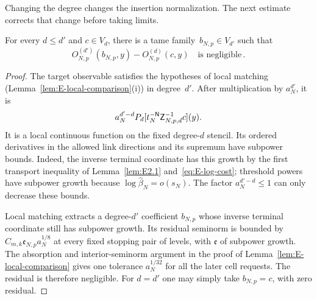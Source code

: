 Changing the degree changes the insertion normalization. The next estimate corrects that change before taking limits.
\begin{lemma}\label{lem:E2.8}
For every $d\le d'$ and $c\in V_d$, there is a tame family~$b_{N,p}\in V_{d'}$ such that
\begin{equation*}
O^{(d')}_{N,p}(b_{N,p},y)-O^{(d)}_{N,p}(c,y)
\quad\text{is negligible}\,.
\end{equation*}
\end{lemma}
\begin{proof}
The target observable satisfies the hypotheses of local matching (Lemma~\ref{lem:E-local-comparison}(i)) in degree~$d'$. After multiplication by $a_N^{d'}$, it is
\begin{equation*}
a_N^{d'-d}P_d[t_N^{-\mathsf{N}}\mathsf Z_{N,p,d}^{-1}c](y).
\end{equation*}
It is a local continuous function on the fixed degree-$d$ stencil. Its ordered derivatives in the allowed link directions and its supremum have subpower bounds. Indeed, the inverse terminal coordinate has this growth by the first transport inequality of Lemma~\ref{lem:E2.1} and~\eqref{eq:E-log-cost}; threshold powers have subpower growth because $\log\widehat\beta_N=o(s_N)$. The factor $a_N^{d'-d}\le1$ can only decrease these bounds.

Local matching extracts a degree-$d'$ coefficient $b_{N,p}$ whose inverse terminal coordinate still has subpower growth. Its residual seminorm is bounded by $C_{m,k}\mathfrak e_{N,p}a_N^{1/8}$ at every fixed stopping pair of levels, with $\mathfrak e$ of subpower growth. The absorption and interior-seminorm argument in the proof of Lemma~\ref{lem:E-local-comparison} gives one tolerance $a_N^{1/32}$ for all the later cell requests. The residual is therefore negligible. For $d=d'$ one may simply take $b_{N,p}=c$, with zero residual.
\end{proof}

